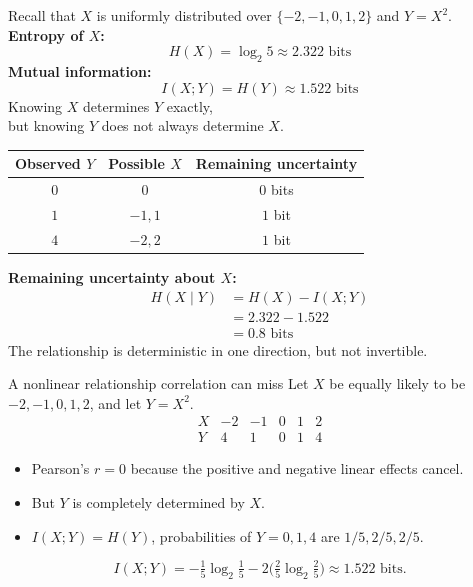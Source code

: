 \documentclass[aspectratio=43,11pt]{beamer}
\begin{document}
\begin{frame}[t]{}
\small
Recall that $X$ is uniformly distributed over $\{-2,-1,0,1,2\}$ and $Y=X^2$.\\
\medskip
\textbf{Entropy of $X$:}
\[
H(X)=\log_2 5\approx 2.322\text{ bits}
\]
\textbf{Mutual information:}
\[
I(X;Y)=H(Y)\approx 1.522\text{ bits}
\]
Knowing $X$ determines $Y$ exactly,\\
but knowing $Y$ does not always determine $X$.
\begin{center}
\begin{tabular}{ccc}
\toprule
Observed $Y$ & Possible $X$ & Remaining uncertainty \\
\midrule
$0$ & $0$       & $0$ bits \\
$1$ & $-1,1$    & $1$ bit \\
$4$ & $-2,2$    & $1$ bit \\
\bottomrule
\end{tabular}
\end{center}
\textbf{Remaining uncertainty about $X$:}
\[
\begin{aligned}
H(X\mid Y)
&=H(X)-I(X;Y)\\
&=2.322-1.522\\
&=\boxed{0.8\text{ bits}}
\end{aligned}
\]
The relationship is deterministic in one direction, but not invertible.
\end{frame}





\begin{frame}{A nonlinear relationship correlation can miss}
Let $X$ be equally likely to be $-2,-1,0,1,2$, and let $Y=X^2$.
\[
\begin{array}{c|ccccc}
X & -2&-1&0&1&2\\\hline
Y &4&1&0&1&4
\end{array}
\]
\begin{itemize}
\item Pearson's $r=0$ because the positive and negative linear effects cancel.
\item But $Y$ is completely determined by $X$.
\item $I(X;Y)=H(Y)$, probabilities of $Y=0,1,4$ are $1/5,2/5,2/5$.
\end{itemize}
\[
I(X;Y)=-\tfrac15\log_2\tfrac15-2\bigl(\tfrac25\log_2\tfrac25\bigr)
\approx\boxed{1.522\text{ bits}}.
\]
\end{frame}
\end{document}
